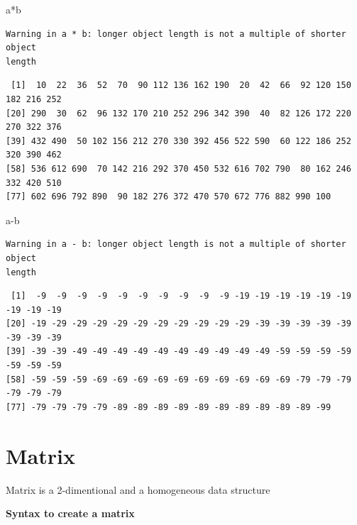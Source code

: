 \documentclass[
  letterpaper,
  DIV=11,
  numbers=noendperiod]{scrreprt}
\newenvironment{Shaded}{\begin{snugshade}}{\end{snugshade}}
\newcommand{\NormalTok}[1]{\textcolor[rgb]{0.00,0.23,0.31}{#1}}
\newcommand{\SpecialCharTok}[1]{\textcolor[rgb]{0.37,0.37,0.37}{#1}}
\begin{document}
\begin{Shaded}
\begin{Highlighting}[]
\NormalTok{a}\SpecialCharTok{*}\NormalTok{b}
\end{Highlighting}
\end{Shaded}

\begin{verbatim}
Warning in a * b: longer object length is not a multiple of shorter object
length
\end{verbatim}

\begin{verbatim}
 [1]  10  22  36  52  70  90 112 136 162 190  20  42  66  92 120 150 182 216 252
[20] 290  30  62  96 132 170 210 252 296 342 390  40  82 126 172 220 270 322 376
[39] 432 490  50 102 156 212 270 330 392 456 522 590  60 122 186 252 320 390 462
[58] 536 612 690  70 142 216 292 370 450 532 616 702 790  80 162 246 332 420 510
[77] 602 696 792 890  90 182 276 372 470 570 672 776 882 990 100
\end{verbatim}

\begin{Shaded}
\begin{Highlighting}[]
\NormalTok{a}\SpecialCharTok{{-}}\NormalTok{b}
\end{Highlighting}
\end{Shaded}

\begin{verbatim}
Warning in a - b: longer object length is not a multiple of shorter object
length
\end{verbatim}

\begin{verbatim}
 [1]  -9  -9  -9  -9  -9  -9  -9  -9  -9  -9 -19 -19 -19 -19 -19 -19 -19 -19 -19
[20] -19 -29 -29 -29 -29 -29 -29 -29 -29 -29 -29 -39 -39 -39 -39 -39 -39 -39 -39
[39] -39 -39 -49 -49 -49 -49 -49 -49 -49 -49 -49 -49 -59 -59 -59 -59 -59 -59 -59
[58] -59 -59 -59 -69 -69 -69 -69 -69 -69 -69 -69 -69 -69 -79 -79 -79 -79 -79 -79
[77] -79 -79 -79 -79 -89 -89 -89 -89 -89 -89 -89 -89 -89 -89 -99
\end{verbatim}

\section{Matrix}\label{matrix}

Matrix is a 2-dimentional and a homogeneous data structure

\textbf{Syntax to create a matrix}
\end{document}
